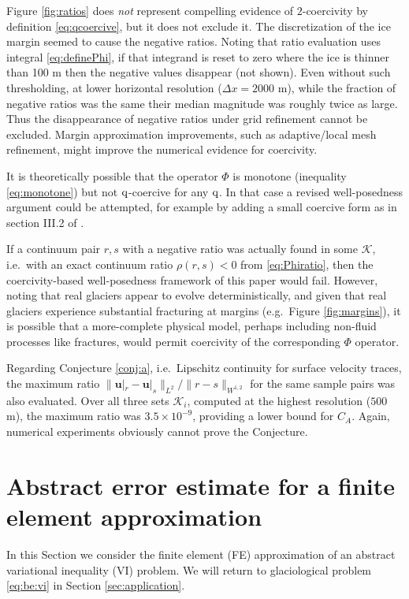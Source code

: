 \documentclass[hidelinks,onefignum,onetabnum,final]{siamart220329}  %
\newcommand{\bu}{\mathbf{u}}
\newcommand{\cK}{\mathcal{K}}
\newcommand{\qq}{{\text{\textnormal{q}}}}
\begin{document}
Figure \ref{fig:ratios} does \emph{not} represent compelling evidence of $2$-coercivity by definition \eqref{eq:qcoercive}, but it does not exclude it.  The discretization of the ice margin seemed to cause the negative ratios.  Noting that ratio evaluation uses integral \eqref{eq:definePhi}, if that integrand is reset to zero where the ice is thinner than 100 m then the negative values disappear (not shown).  Even without such thresholding, at lower horizontal resolution ($\Delta x=2000$ m), while the fraction of negative ratios was the same their median magnitude was roughly twice as large.  Thus the disappearance of negative ratios under grid refinement cannot be excluded.  Margin approximation improvements, such as adaptive/local mesh refinement, might improve the numerical evidence for coercivity.

It is theoretically possible that the operator $\Phi$ is monotone (inequality \ref{eq:monotone}) but not $\qq$-coercive for any $\qq$.  In that case a revised well-posedness argument could be attempted, for example by adding a small coercive form as in section III.2 of \cite{KinderlehrerStampacchia1980}.

If a continuum pair $r,s$ with a negative ratio was actually found in some $\cK$, i.e.~with an exact continuum ratio $\rho(r,s)<0$ from \eqref{eq:Phiratio}, then the coercivity-based well-posedness framework of this paper would fail.  However, noting that real glaciers appear to evolve deterministically, and given that real glaciers experience substantial fracturing at margins (e.g.~Figure \ref{fig:margins}), it is possible that a more-complete physical model, perhaps including non-fluid processes like fractures, would permit coercivity of the corresponding $\Phi$ operator.

Regarding Conjecture \ref{conj:a}, i.e.~Lipschitz continuity for surface velocity traces, the maximum ratio $\big\|\bu|_r - \bu|_s\big\|_{L^2}/\|r-s\|_{W^{1,2}}$ for the same sample pairs was also evaluated.  Over all three sets $\cK_i$, computed at the highest resolution ($500$ m), the maximum ratio was $3.5\times 10^{-9}$, providing a lower bound for $C_A$.  Again, numerical experiments obviously cannot prove the Conjecture.


\section{Abstract error estimate for a finite element approximation} \label{sec:abstractestimate}

In this Section we consider the finite element (FE) approximation of an abstract variational inequality (VI) problem.  We will return to glaciological problem \eqref{eq:be:vi} in Section \ref{sec:application}.
\end{document}
